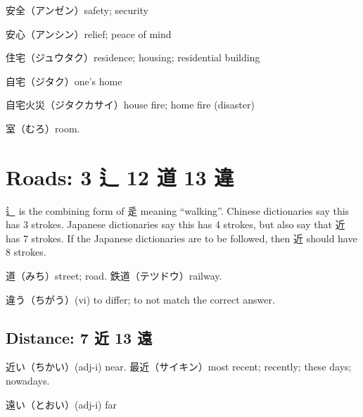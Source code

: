 安全（アンゼン）safety; security

安心（アンシン）relief; peace of mind

住宅（ジュウタク）residence; housing; residential building

自宅（ジタク）one's home

自宅火災（ジタクカサイ）house fire; home fire (disaster)

室（むろ）room.

\section{Roads: 3 辶 12 道 13 違}

辶 is the combining form of 辵 meaning ``walking''.
Chinese dictionaries say this has 3 strokes.
Japanese dictionaries say this has 4 strokes,
but also say that 近 has 7 strokes.
If the Japanese dictionaries are to be followed,
then 近 should have 8 strokes.

道（みち）street; road.
鉄道（テツドウ）railway.

違う（ちがう）(vi) to differ; to not match the correct answer.

\subsection{Distance: 7 近 13 遠}

近い（ちかい）(adj-i) near.
最近（サイキン）most recent; recently; these days; nowadays.

遠い（とおい）(adj-i) far

